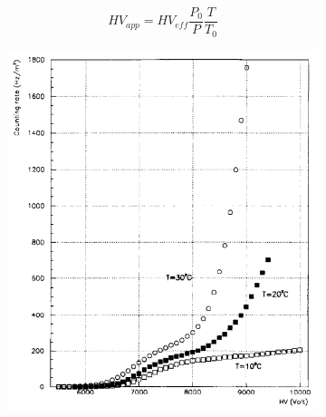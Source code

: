 	\begin{equation}
	\label{eq:PTSimple}
	HV_{app} = HV_{eff}\frac{P_0}{P}\frac{T}{T_0}
	\end{equation}
	
\endgroup
	
\begingroup\setlength{\intextsep}{10pt}\setlength{\columnsep}{15pt}
	
	\begin{figure}
		\begin{subfigure}{\linewidth}
			\centering
			\includegraphics[width = \linewidth]{fig/chapt3/Rate-temperature.png}\\
			\caption{\label{fig:TCorr:A}}
		\end{subfigure}
		\begin{subfigure}{\linewidth}
		    \centering

\end{subfigure}
\end{figure}
